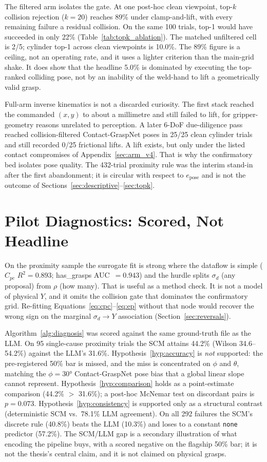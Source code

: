 \documentclass[11pt,a4paper]{report}
\begin{document}
The filtered arm isolates the gate. At one post-hoc clean viewpoint, top-$k$ collision rejection ($k=20$) reaches 89\% under clamp-and-lift, with every remaining failure a residual collision. On the same 100 trials, top-1 would have succeeded in only 22\% (Table~\ref{tab:topk_ablation}). The matched unfiltered cell is 2/5; cylinder top-1 across clean viewpoints is 10.0\%. The 89\% figure is a ceiling, not an operating rate, and it uses a lighter criterion than the main-grid shake. It does show that the headline 5.0\% is dominated by executing the top-ranked colliding pose, not by an inability of the weld-hand to lift a geometrically valid grasp.

Full-arm inverse kinematics is not a discarded curiosity. The first stack reached the commanded $(x,y)$ to about a millimetre and still failed to lift, for gripper-geometry reasons unrelated to perception. A later 6-DoF due-diligence pass reached collision-filtered Contact-GraspNet poses in 25/25 clean cylinder trials and still recorded 0/25 frictional lifts. A lift exists, but only under the listed contact compromises of Appendix~\ref{sec:arm_v4}. That is why the confirmatory bed isolates pose quality. The 432-trial proximity rule was the interim stand-in after the first abandonment; it is circular with respect to $e_{\text{pose}}$ and is not the outcome of Sections~\ref{sec:descriptive}--\ref{sec:topk}.

\section{Pilot Diagnostics: Scored, Not Headline}
\label{sec:pilot_diagnostics}

On the proximity sample the surrogate fit is strong where the dataflow is simple ($C_{pc}$ $R^2 = 0.893$; has\_grasps AUC~$= 0.943$) and the hurdle splits $\sigma_d$ (any proposal) from $\rho$ (how many). That is useful as a method check. It is not a model of physical $Y$, and it omits the collision gate that dominates the confirmatory grid. Re-fitting Equations~\eqref{eq:cpc}--\eqref{eq:ep} without that node would recover the wrong sign on the marginal $\sigma_d \to Y$ association (Section~\ref{sec:reversals}).

Algorithm~\ref{alg:diagnosis} was scored against the same ground-truth file as the LLM. On 95 single-cause proximity trials the SCM attains 44.2\% (Wilson 34.6--54.2\%) against the LLM's 31.6\%. Hypothesis~\ref{hyp:accuracy} is \emph{not} supported: the pre-registered 50\% bar is missed, and the miss is concentrated on $\phi$ and $\theta$, matching the $\phi=30°$ Contact-GraspNet pose bias that a global linear slope cannot represent. Hypothesis~\ref{hyp:comparison} holds as a point-estimate comparison (44.2\% $>$ 31.6\%); a post-hoc McNemar test on discordant pairs is $p=0.073$. Hypothesis~\ref{hyp:consistency} is supported only as a structural contrast (deterministic SCM vs.\ 78.1\% LLM agreement). On all 292 failures the SCM's discrete rule (40.8\%) beats the LLM (10.3\%) and loses to a constant \texttt{none} predictor (57.2\%). The SCM/LLM gap is a secondary illustration of what encoding the pipeline buys, with a scored negative on the flagship 50\% bar; it is not the thesis's central claim, and it is not claimed on physical grasps.
\end{document}
